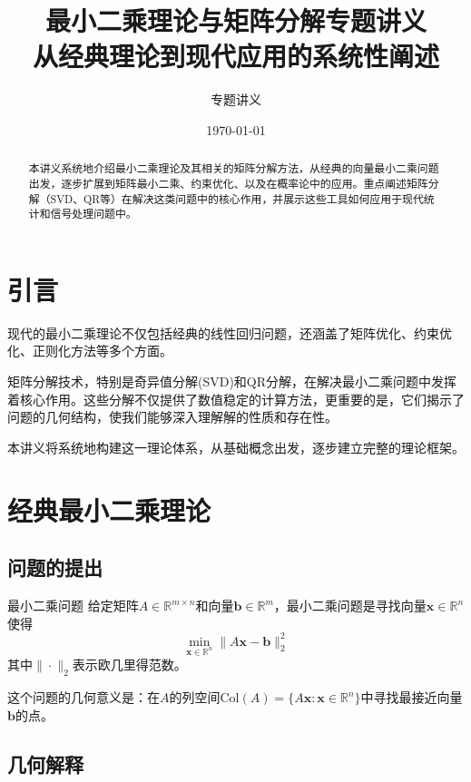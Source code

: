 \documentclass[11pt,a4paper]{ctexart}
\title{\textbf{最小二乘理论与矩阵分解专题讲义} \\ 
       \large 从经典理论到现代应用的系统性阐述}
\author{专题讲义}
\date{\today}
\theoremstyle{definition}
\newcommand{\RR}{\mathbb{R}}
\newcommand{\Col}{\text{Col}}
\begin{document}
\maketitle

\begin{abstract}
本讲义系统地介绍最小二乘理论及其相关的矩阵分解方法，从经典的向量最小二乘问题出发，逐步扩展到矩阵最小二乘、约束优化、以及在概率论中的应用。重点阐述矩阵分解（SVD、QR等）在解决这类问题中的核心作用，并展示这些工具如何应用于现代统计和信号处理问题中。
\end{abstract}

\tableofcontents
\newpage

\section{引言}

现代的最小二乘理论不仅包括经典的线性回归问题，还涵盖了矩阵优化、约束优化、正则化方法等多个方面。

矩阵分解技术，特别是奇异值分解(SVD)和QR分解，在解决最小二乘问题中发挥着核心作用。这些分解不仅提供了数值稳定的计算方法，更重要的是，它们揭示了问题的几何结构，使我们能够深入理解解的性质和存在性。

本讲义将系统地构建这一理论体系，从基础概念出发，逐步建立完整的理论框架。

\section{经典最小二乘理论}

\subsection{问题的提出}

\begin{importantdef}{最小二乘问题}
给定矩阵$A \in \RR^{m \times n}$和向量$\boldsymbol{b} \in \RR^m$，最小二乘问题是寻找向量$\boldsymbol{x} \in \RR^n$使得
$$\min_{\boldsymbol{x} \in \RR^n} \|A\boldsymbol{x} - \boldsymbol{b}\|_2^2$$
其中$\|\cdot\|_2$表示欧几里得范数。
\end{importantdef}

这个问题的几何意义是：在$A$的列空间$\Col(A) = \{A\boldsymbol{x} : \boldsymbol{x} \in \RR^n\}$中寻找最接近向量$\boldsymbol{b}$的点。

\subsection{几何解释}
\end{document}
